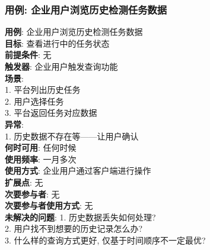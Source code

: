 \documentclass[UTF8]{article}
\begin{document}
\subsubsection{用例: 企业用户浏览历史检测任务数据}
\noindent
\textbf{用例}: 企业用户浏览历史检测任务数据
\\
\textbf{目标}: 查看进行中的任务状态
\\
\textbf{前提条件}: 无
\\
\textbf{触发器}: 企业用户触发查询功能
\\
\textbf{场景}: \\
	\hspace*{2em} 1. 平台列出历史任务 \\
	\hspace*{2em} 2. 用户选择任务 \\
	\hspace*{2em} 3. 平台返回任务对应数据 \\
\textbf{异常}: \\
	\hspace*{2em} 1. 历史数据不存在等——让用户确认 \\
\textbf{何时可用}: 任何时候 \\
\textbf{使用频率}: 一月多次 \\
\textbf{使用方式}: 企业用户通过客户端进行操作 \\
\textbf{扩展点}: 无 \\
\textbf{次要参与者}: 无 \\
\textbf{次要参与者使用方式}: 无 \\
\textbf{未解决的问题}: 
	\hspace*{2em} 1. 历史数据丢失如何处理? \\
	\hspace*{2em} 2. 用户找不到想要的历史记录怎么办? \\
	\hspace*{2em} 3. 什么样的查询方式更好, 仅基于时间顺序不一定最优? \\
				
\end{document}
